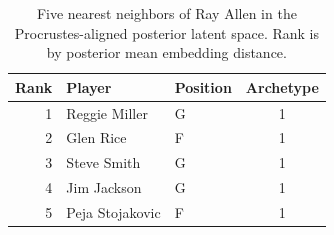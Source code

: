 \begin{table}[htbp]
  \centering\small
  \begin{tabular}{rllc}
    \toprule
    Rank & Player & Position & Archetype \\
    \midrule
    1 & Reggie Miller & G & 1 \\
    2 & Glen Rice & F & 1 \\
    3 & Steve Smith & G & 1 \\
    4 & Jim Jackson & G & 1 \\
    5 & Peja Stojakovic & F & 1 \\
    \bottomrule
  \end{tabular}
  \caption{Five nearest neighbors of Ray Allen in the Procrustes-aligned posterior latent space. Rank is by posterior mean embedding distance.}
  \label{tab:Ray_Allen_neighbors}
\end{table}

